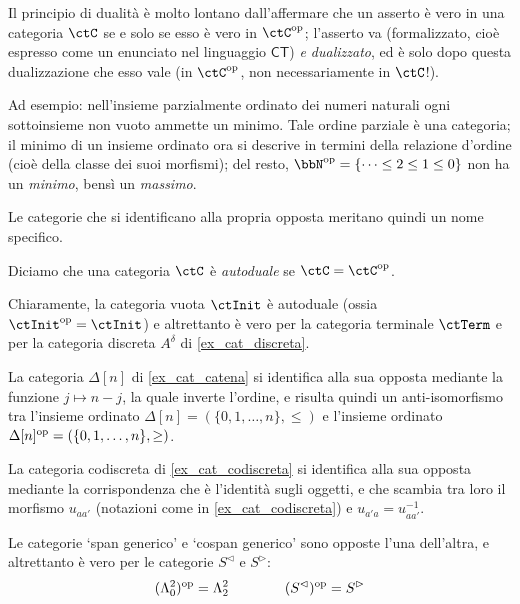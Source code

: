 \begin{remark}
	Il principio di dualità è molto lontano dall'affermare che un asserto è vero in una categoria \(\ctC\) se e solo se esso è vero in \(\ctC^\op\); l'asserto va (formalizzato, cioè espresso come un enunciato nel linguaggio \(\mathsf{CT}\)) \emph{e dualizzato}, ed è solo dopo questa dualizzazione che esso vale (in \(\ctC^\op\), non necessariamente in \(\ctC\)!).

	Ad esempio: nell'insieme parzialmente ordinato dei numeri naturali ogni sottoinsieme non vuoto ammette un minimo. Tale ordine parziale è una categoria; il minimo di un insieme ordinato ora si descrive in termini della relazione d'ordine (cioè della classe dei suoi morfismi); del resto, \(\bbN^\op = \{\dots\le 2 \le 1 \le 0\}\) non ha un \emph{minimo}, bensì un \emph{massimo}.
\end{remark}
Le categorie che si identificano alla propria opposta meritano quindi un nome specifico.
\begin{definition}
	Diciamo che una categoria \(\ctC\) è \emph{autoduale} se \(\ctC=\ctC^\op\).
\end{definition}
\begin{example}
	Chiaramente, la categoria vuota \(\ctInit\) è autoduale (ossia \(\ctInit^\op=\ctInit\)) e altrettanto è vero per la categoria terminale \(\ctTerm\) e per la categoria discreta \(A^\delta\) di \ref{ex_cat_discreta}.

	La categoria \(\Delta[n]\) di \ref{ex_cat_catena} si identifica alla sua opposta mediante la funzione \(j\mapsto n-j\), la quale inverte l'ordine, e risulta quindi un anti-isomorfismo tra l'insieme ordinato \(\Delta[n]=(\{0,1,\dots,n\},\le)\) e l'insieme ordinato \(\Delta[n]^{\text{op}} = (\{0,1,\dots,n\},\ge)\).

	La categoria codiscreta di \ref{ex_cat_codiscreta} si identifica alla sua opposta mediante la corrispondenza che è l'identità sugli oggetti, e che scambia tra loro il morfismo \(u_{aa'}\) (notazioni come in \ref{ex_cat_codiscreta}) e \(u_{a'a} = u_{aa'}^{-1}\).

	Le categorie `span generico' e `cospan generico' sono opposte l'una dell'altra, e altrettanto è vero per le categorie \(S^\lhd\) e \(S^\rhd\):
	\[(\Lambda^2_0)^{\text{op}} = \Lambda^2_2\qquad\qquad (S^\lhd)^{\text{op}} = S^\rhd\]
\end{example}
